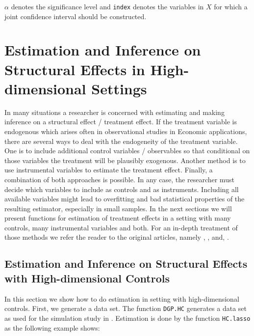 \documentclass{amsart}
\begin{document}
$\alpha$ denotes the significance level and \texttt{index} denotes the variables in $X$ for which a joint confidence interval should be constructed.

\section{Estimation and Inference on Structural Effects in High-dimensional Settings}
In many situations a researcher is concerned with estimating and making inference on a structural effect / treatment effect. If the treatment variable is endogenous which arises often in observational studies in Economic applications,  there are several ways to deal with the endogeneity of the treatment variable. One is to include additional control variables / observables so that conditional on those variables the treatment will be plausibly exogenous. Another method is to use instrumental variables to estimate the treatment effect. Finally, a combination of both approaches is possible. In any case, the researcher must decide which variables to include as controls and as instruments. Including all available variables might lead to overfitting and bad statistical properties of the resulting estimator, especially in small samples. In the next sections we will present functions for estimation of treatment effects in a setting with many controls, many instrumental variables and both. For an in-depth treatment of those methods we refer the reader to the original articles, namely \cite{BelloniChernozhukovHansen2011}, \cite{BCCH12}, and, \cite{CHS:2015}.

\subsection{Estimation and Inference on Structural Effects with High-dimensional Controls}
In this section we show how to do estimation in setting with high-dimensional controls. First, we generate a data set. The function \texttt{DGP.HC} generates a data set as used for the simulation study in \cite{BelloniChernozhukovHansen2011}. Estimation is done by the function \texttt{HC.lasso} as the following example shows:
\end{document}
